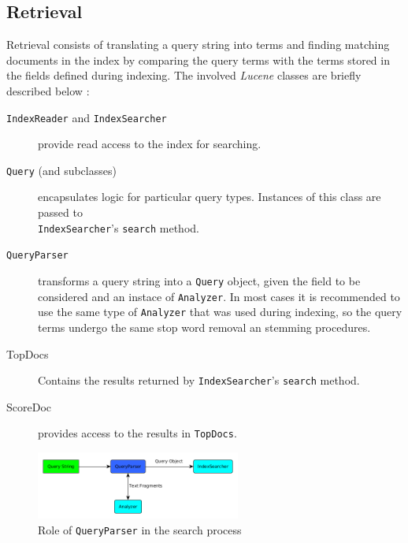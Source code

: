 \documentclass[a4paper]{usiinfbachelorproject}
\begin{document}
\newpage

\subsection{\textbf{Retrieval}} \label{sec:implRetrieval}

Retrieval consists of translating a query string into terms and finding matching documents in the index by comparing
the query terms with the terms stored in the fields defined during indexing. The involved \emph{Lucene} 
classes are briefly described below \cite{luceneInAction}:

\begin{description}

    \item[\texttt{IndexReader} and \texttt{IndexSearcher}] provide read access to the index for searching.

    \item[\texttt{Query} (and subclasses)] encapsulates logic for particular query types. Instances of this class
            are passed to \\ \texttt{IndexSearcher}'s \texttt{search} method.

    \item[\texttt{QueryParser}] transforms a query string into a \texttt{Query} object, given the field to be considered
            and an instace of \texttt{Analyzer}. In most cases it is recommended to use the same type of \texttt{Analyzer}
            that was used during indexing, so the query terms undergo the same stop word removal an stemming procedures.

    \item[TopDocs] Contains the results returned by \texttt{IndexSearcher}'s \texttt{search} method.

    \item[ScoreDoc] provides access to the results in \texttt{TopDocs}.

\end{description}

\begin{figure}[h!]
\centering
\includegraphics[width=0.6\textwidth]{figures/queryParser}
\caption{Role of \texttt{QueryParser} in the search process \cite{luceneInAction}}
\label{fig:queryParser}
\end{figure}
\end{document}
